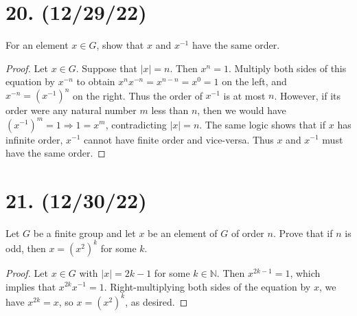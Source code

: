 \documentclass{article}
\begin{document}
\section*{20. (12/29/22)}

For an element $x \in G$, show that $x$ and $x^{-1}$ have the same order.

\begin{proof}
      Let $x \in G$. Suppose that $|x| = n$. Then $x^n = 1$. Multiply both sides of this equation by $x^{-n}$ to obtain $x^n x^{-n} = x^{n - n} = x^0 = 1$ on the left, and $x^{-n} = (x^{-1})^n$ on the right. Thus the order of $x^{-1}$ is at most $n$. However, if its order were any natural number $m$ less than $n$, then we would have\newline
      $(x^{-1})^m = 1 \Rightarrow 1 = x^m$, contradicting $|x| = n$. The same logic shows that if $x$ has infinite order, $x^{-1}$ cannot have finite order and vice-versa. Thus $x$ and $x^{-1}$ must have the same order.
\end{proof}

\section*{21. (12/30/22)}

Let $G$ be a finite group and let $x$ be an element of $G$ of order $n$. Prove that if $n$ is odd, then $x = (x^2)^k$ for some $k$.

\begin{proof}
      Let $x \in G$ with $|x| = 2k - 1$ for some $k \in \mathbb{N}$. Then $x^{2k - 1} = 1$, which implies that $x^{2k} x^{-1} = 1$. Right-multiplying both sides of the equation by $x$, we have $x^{2k} = x$, so $x = (x^2)^k$, as desired.
\end{proof}
\end{document}
